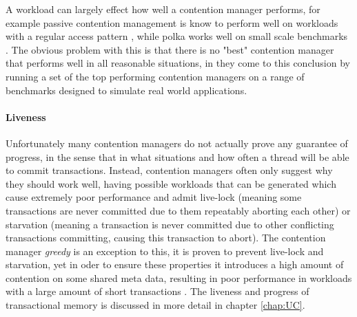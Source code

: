 A workload can largely effect how well a contention manager performs, for example passive contention
 management is know to perform well on workloads with a regular access pattern \cite{1504199}, while
 polka works well on small scale benchmarks \cite{DGK09}.
The obvious problem with this is that there is no "best" contention manager that performs well in 
all reasonable situations, in \cite{guerraoui05polymorphic/LPD} they come to this conclusion by 
running a set of the top performing contention managers on a range of benchmarks designed to simulate real world applications.

\paragraph{Liveness}
Unfortunately many contention managers do not actually prove any guarantee of progress,
in the sense that in what situations and how often a thread will be able to commit transactions.
Instead, contention managers often only suggest why they should work well, having possible workloads that can be generated which 
cause extremely poor performance and admit live-lock (meaning some transactions are never committed due to them
repeatably aborting each other) or starvation (meaning a transaction is never committed due to other conflicting transactions committing,
causing this transaction to abort).
The contention manager \emph{greedy} \cite{GHP05} is an exception to this,
it is proven to prevent live-lock and starvation, yet in oder to ensure these properties it
 introduces a high amount of contention on some shared meta data, resulting in poor performance in
 workloads with a large amount of short transactions \cite{DGK09}.
The liveness and progress of transactional memory is discussed in more detail in chapter
\ref{chap:UC}.





















